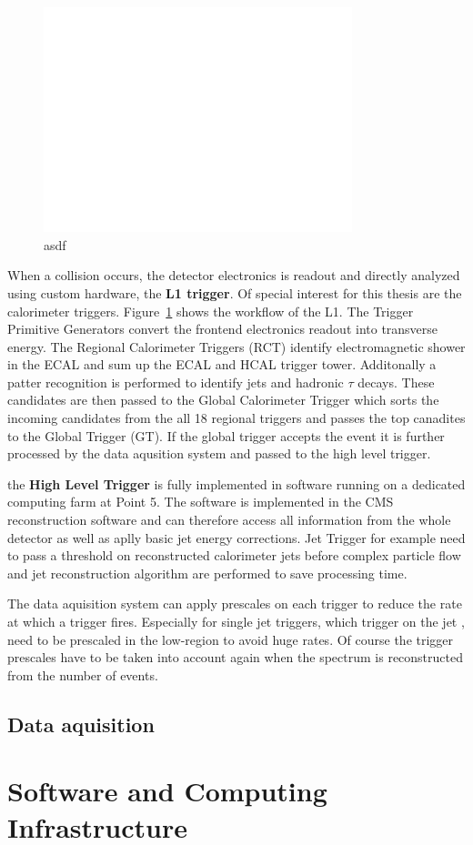 \begin{figure}[htp]
    \centering
    \includegraphics[width=0.8\textwidth]{figures/cms_detector/cms_l1_trigger.pdf}\hfill
    \caption[The L1 Trigger of CMS.]{asdf}
    \label{fig:cms:l1_trigger}
\end{figure}

When a collision occurs, the detector electronics is readout and directly
analyzed using custom hardware, the \textbf{L1 trigger}. Of special interest for
this thesis are the calorimeter triggers. Figure~\ref{fig:cms:l1_trigger} shows
the workflow of the L1. The Trigger Primitive Generators convert the frontend
electronics readout into transverse energy. The Regional Calorimeter Triggers
(RCT) identify electromagnetic shower in the ECAL and sum up the ECAL and HCAL
trigger tower. Additonally a patter recognition is performed to identify jets
and hadronic $\tau$ decays. These candidates are then passed to the Global
Calorimeter Trigger which sorts the incoming candidates from the all 18 regional
triggers and passes the top canadites to the Global Trigger (GT). If the global
trigger accepts the event it is further processed by the data aqusition system
and passed to the high level trigger.

the \textbf{High Level Trigger} is fully implemented in software running on a
dedicated computing farm at Point 5. The software is implemented in the CMS
reconstruction software and can therefore access all information from the whole
detector as well as aplly basic jet energy corrections. Jet Trigger for example
need to pass a \pt threshold on reconstructed calorimeter jets before complex
particle flow and jet reconstruction algorithm are performed to save processing
time.

The data aquisition system can apply prescales on each trigger to reduce the
rate at which a trigger fires. Especially for single jet triggers, which
trigger on the jet \pt, need to be prescaled in the low-\pt region to avoid huge
rates. Of course the trigger prescales have to be taken into account again when
the spectrum is reconstructed from the number of events.

\subsection{Data aquisition}

\section{Software and Computing Infrastructure}


